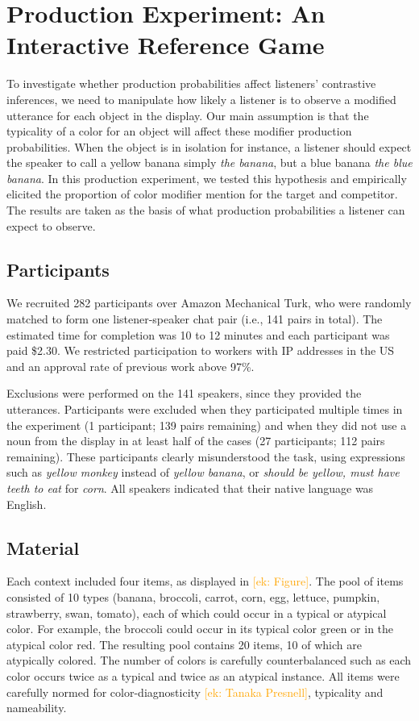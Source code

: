 \documentclass[10pt,letterpaper]{article}
\newcommand{\ek}[1]{\textcolor{Orange}{[ek: #1]}}
\begin{document}
\section{Production Experiment: An Interactive Reference Game}

To investigate whether production probabilities affect listeners' contrastive inferences, we need to manipulate how likely a listener is to observe a modified utterance for each object in the display. Our main assumption is that the typicality of a color for an object will affect these modifier production probabilities. When the object is in isolation for instance, a listener should expect the speaker to call a yellow banana simply \textit{the banana}, but a blue banana \textit{the blue banana}. In this production experiment, we tested this hypothesis and empirically elicited the proportion of color modifier mention for the target and competitor. The results are taken as the basis of what production probabilities a listener can expect to observe.


\subsection{Participants}
We recruited 282 participants over Amazon Mechanical Turk, who were randomly matched to form one listener-speaker chat pair (i.e., 141 pairs in total). 
The estimated time for completion was 10 to 12 minutes and each participant was paid \$2.30. We restricted participation to workers with IP addresses in the US and an approval rate of previous work above 97\%.

Exclusions were performed on the 141 speakers, since they provided the utterances. Participants were excluded when they participated multiple times in the experiment (1 participant; 139 pairs remaining) and when they did not use a noun from the display in at least half of the cases (27 participants; 112 pairs remaining). These participants clearly misunderstood the task, using expressions such as \textit{yellow monkey} instead of \textit{yellow banana}, or \textit{should be yellow, must have teeth to eat} for \textit{corn}. All speakers indicated that their native language was English.


\subsection{Material}
Each context included four items, as displayed in \ek{Figure}. The pool of items consisted of 10 types (banana, broccoli, carrot, corn, egg, lettuce, pumpkin, strawberry, swan, tomato), each of which could occur in a typical or atypical color. For example, the broccoli could occur in its typical color green or in the atypical color red. The resulting pool contains 20 items, 10 of which are atypically colored. The number of colors is carefully counterbalanced such as each color occurs twice as a typical and twice as an atypical instance. All items were carefully normed for color-diagnosticity \ek{Tanaka Presnell}, typicality and nameability.
\end{document}
